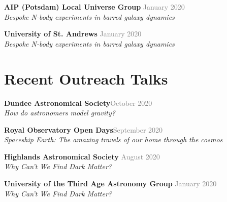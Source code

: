 \documentclass[margin, a4paper,11pt]{res} %
\begin{document}
\begin{resume}
{\bf AIP (Potsdam) Local Universe Group} \hfill\textcolor{grey}{January 2020}\\
{\it Bespoke N-body experiments in barred galaxy dynamics}

{\bf University of St. Andrews} \hfill\textcolor{grey}{January 2020}\\
{\it Bespoke N-body experiments in barred galaxy dynamics}

\section{\sc \textcolor{redshade}{Recent Outreach Talks}}
{\bf Dundee Astronomical Society}\hfill\textcolor{grey}{October 2020} \\
{\it How do astronomers model gravity?}

{\bf Royal Observatory Open Days}\hfill\textcolor{grey}{September 2020} \\
{\it Spaceship Earth: The amazing travels of our home through the cosmos}

{\bf Highlands Astronomical Society} \hfill\textcolor{grey}{August 2020}\\
{\it Why Can't We Find Dark Matter?}

{\bf University of the Third Age Astronomy Group} \hfill\textcolor{grey}{January 2020}\\
{\it Why Can't We Find Dark Matter?}









\end{resume}
\end{document}

